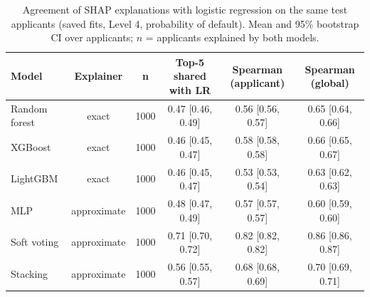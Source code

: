 \begin{table}[t]
\caption{Agreement of SHAP explanations with logistic regression on the same test applicants (saved fits, Level 4, probability of default). Mean and 95\% bootstrap CI over applicants; $n$ = applicants explained by both models.}
\label{tab:rq3_agree}
\centering
\small
\begin{tabular}{lccccc}
\hline
Model & Explainer & n & Top-5 shared with LR & Spearman (applicant) & Spearman (global) \\
\hline
Random forest & exact & 1000 & 0.47 [0.46, 0.49] & 0.56 [0.56, 0.57] & 0.65 [0.64, 0.66] \\
XGBoost & exact & 1000 & 0.46 [0.45, 0.47] & 0.58 [0.58, 0.58] & 0.66 [0.65, 0.67] \\
LightGBM & exact & 1000 & 0.46 [0.45, 0.47] & 0.53 [0.53, 0.54] & 0.63 [0.62, 0.63] \\
MLP & approximate & 1000 & 0.48 [0.47, 0.49] & 0.57 [0.57, 0.57] & 0.60 [0.59, 0.60] \\
Soft voting & approximate & 1000 & 0.71 [0.70, 0.72] & 0.82 [0.82, 0.82] & 0.86 [0.86, 0.87] \\
Stacking & approximate & 1000 & 0.56 [0.55, 0.57] & 0.68 [0.68, 0.69] & 0.70 [0.69, 0.71] \\
\hline
\end{tabular}
\end{table}